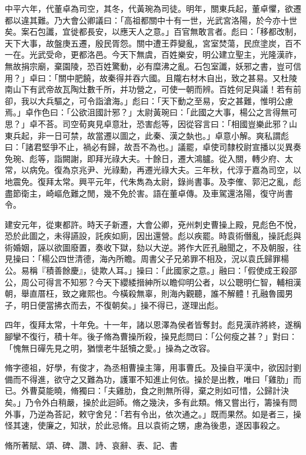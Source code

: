 \begin{pinyinscope}
中平六年，代董卓為司空，其冬，代黃琬為司徒。明年，關東兵起，董卓懼，欲遷都以違其難。乃大會公卿議曰：「高祖都關中十有一世，光武宮洛陽，於今亦十世矣。案石包讖，宜徙都長安，以應天人之意。」百官無敢言者。彪曰：「移都改制，天下大事，故盤庚五遷，殷民胥怨。關中遭王莽變亂，宮室焚蕩，民庶塗炭，百不一在。光武受命，更都洛邑。今天下無虞，百姓樂安，明公建立聖主，光隆漢祚，無故捐宗廟，棄園陵，恐百姓驚動，必有糜沸之亂。石包室讖，妖邪之書，豈可信用？」卓曰：「關中肥饒，故秦得并吞六國。且隴右材木自出，致之甚易。又杜陵南山下有武帝故瓦陶灶數千所，并功營之，可使一朝而辨。百姓何足與議！若有前卻，我以大兵驅之，可令詣滄海。」彪曰：「天下動之至易，安之甚難，惟明公慮焉。」卓作色曰：「公欲沮國計邪？」太尉黃琬曰：「此國之大事，楊公之言得無可思？」卓不荅。司空荀爽見卓意壯，恐害彪等，因從容言曰：「相國豈樂此邪？山東兵起，非一日可禁，故當遷以圖之，此秦、漢之埶也。」卓意小解。爽私謂彪曰：「諸君堅爭不止，禍必有歸，故吾不為也。」議罷，卓使司隸校尉宣播以災異奏免琬、彪等，詣闕謝，即拜光祿大夫。十餘日，遷大鴻臚。從入關，轉少府、太常，以病免。復為京兆尹、光祿勳，再遷光祿大夫。三年秋，代淳于嘉為司空，以地震免。復拜太常。興平元年，代朱雋為太尉，錄尚書事。及李傕、郭汜之亂，彪盡節衛主，崎嶇危難之閒，幾不免於害。語在董卓傳。及車駕還洛陽，復守尚書令。

建安元年，從東都許。時天子新遷，大會公卿，兗州刺史曹操上殿，見彪色不悅，恐於此圖之，未得讌設，託疾如廁，因出還營。彪以疾罷。時袁術僭亂，操託彪與術婚姻，誣以欲圖廢置，奏收下獄，劾以大逆。將作大匠孔融聞之，不及朝服，往見操曰：「楊公四世清德，海內所瞻。周書父子兄弟罪不相及，況以袁氏歸罪楊公。易稱『積善餘慶』，徒欺人耳。」操曰：「此國家之意。」融曰：「假使成王殺邵公，周公可得言不知邪？今天下纓緌搢紳所以瞻仰明公者，以公聰明仁智，輔相漢朝，舉直厝枉，致之雍熙也。今橫殺無辜，則海內觀聽，誰不解體！孔融魯國男子，明日便當拂衣而去，不復朝矣。」操不得已，遂理出彪。

四年，復拜太常，十年免。十一年，諸以恩澤為侯者皆奪封。彪見漢祚將終，遂稱腳攣不復行，積十年。後子脩為曹操所殺，操見彪問曰：「公何瘦之甚？」對曰：「愧無日磾先見之明，猶懷老牛舐犢之愛。」操為之改容。

脩字德祖，好學，有俊才，為丞相曹操主簿，用事曹氏。及操自平漢中，欲因討劉備而不得進，欲守之又難為功，護軍不知進止何依。操於是出教，唯曰「雞肋」而已。外曹莫能曉，脩獨曰：「夫雞肋，食之則無所得，棄之則如可惜，公歸計決矣。」乃令外白稍嚴，操於此迴師。脩之幾決，多有此類。脩又嘗出行，籌操有問外事，乃逆為荅記，敕守舍兒：「若有令出，依次通之。」既而果然。如是者三，操怪其速，使廉之，知狀，於此忌脩。且以袁術之甥，慮為後患，遂因事殺之。

脩所著賦、頌、碑、讚、詩、哀辭、表、記、書


\end{pinyinscope}
